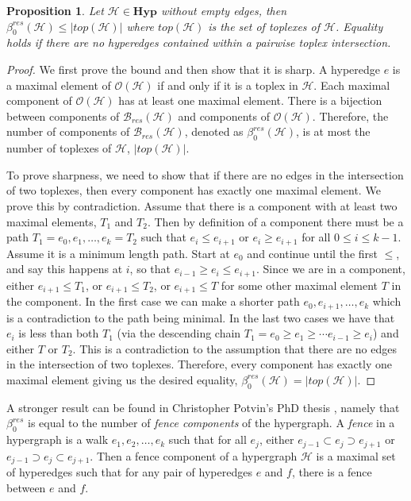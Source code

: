 \documentclass{amsart}
\newtheorem{proposition}[theorem]{Proposition}
\newcommand{\Hyp}{\mathrm{\textbf{Hyp}}}
\newcommand{\betti}[2]{\beta_{#2}^{#1}}
\renewcommand{\H}{\mathcal{H}}
\newcommand{\bary}{\mathcal{B}}
\newcommand{\ECP}{\mathcal{O}}
\begin{document}
\begin{proposition}\label{prop:res_max}
Let $\H \in \Hyp$ without empty edges, then $\betti{res}{0}(\H) \leq |top(\H)|$ where $top(\H)$ is the set of toplexes of $\H$.
Equality holds if there are no hyperedges contained within a pairwise toplex intersection.
\end{proposition}
\begin{proof}
We first prove the bound and then show that it is sharp.
A hyperedge $e$ is a maximal element of $\ECP(\H)$ if and only if it is a toplex in $\H$. 
Each maximal component of $\ECP(\H)$ has at least one maximal element.
There is a bijection between components of $\bary_{res}(\H)$ and components of $\ECP(\H)$.
Therefore, the number of components of $\bary_{res}(\H)$, denoted as $\betti{res}{0}(\H)$, is at most the number of toplexes of $\H$, $|top(\H)|$.

To prove sharpness, we need to show that if there are no edges in the intersection of two toplexes, then every component has exactly one maximal element. 
We prove this by contradiction.
Assume that there is a component with at least two maximal elements, $T_1$ and $T_2$. 
Then by definition of a component there must be a path $T_1 = e_0, e_1, \ldots, e_k = T_2$ such that $e_i \leq e_{i+1}$ or $e_i \geq e_{i+1}$ for all $0\leq i \leq k-1$. 
Assume it is a minimum length path.
Start at $e_0$ and continue until the first $\leq$, and say this happens at $i$, so that $e_{i-1} \geq e_i \leq e_{i+1}$.
Since we are in a component, either $e_{i+1} \leq T_1$, or $e_{i+1} \leq T_2$, or $e_{i+1} \leq T$ for some other maximal element $T$ in the component. 
In the first case we can make a shorter path $e_0, e_{i+1}, \ldots, e_k$ which is a contradiction to the path being minimal.
In the last two cases we have that $e_i$ is less than both $T_1$ (via the descending chain $T_1 = e_0 \geq e_1 \geq \cdots e_{i-1} \geq e_i$) and either $T$ or $T_2$.
This is a contradiction to the assumption that there are no edges in the intersection of two toplexes.
Therefore, every component has exactly one maximal element giving us the desired equality, $\betti{res}{0}(\H) = |top(\H)|$.
\end{proof}

A stronger result can be found in Christopher Potvin's PhD thesis \cite[Theorem 3.2.4]{potvin2023hypergraphs}, namely that $\betti{res}{0}$ is equal to the number of \emph{fence components} of the hypergraph. A \emph{fence} in a hypergraph is a walk $e_{1}, e_{2}, \ldots, e_{k}$ such that for all $e_{j}$, either $e_{j-1} \subset e_{j} \supset e_{j+1}$ or $e_{j-1} \supset e_{j} \subset e_{j+1}$. Then a fence component of a hypergraph $\H$ is a maximal set of hyperedges such that for any pair of hyperedges $e$ and $f$, there is a fence between $e$ and $f$.
\end{document}

